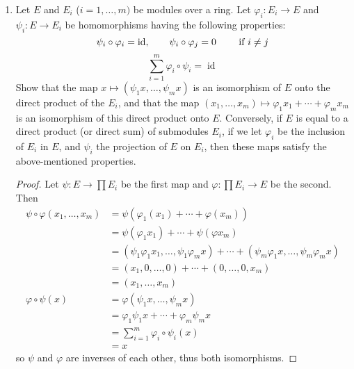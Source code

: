 \documentclass[10pt]{article}
\DeclareMathOperator*{\im}{Im}
\let\ker\relax
\DeclareMathOperator*{\ker}{Ker}
\DeclareMathOperator*{\id}{id}
\begin{document}
\begin{enumerate}
\begin{enumerate}
\begin{proof}
Since $f$ is the inclusion of $M'$, we know that $M = \im f \oplus N$ for some submodule $N$.  But $\im f \cong \ker g$, therefore $$M'' \cong M / \ker g = M / \im f \cong N$$
where the last equivalence follows from the fact that $0 \rightarrow A \rightarrow A \oplus B \rightarrow B \rightarrow 0$ is exact for any modules $A$ and $B$, so $(A \oplus B)/ A \cong B$ (we are taking $A = \im f$ and $B = N$).

\end{proof}

\item Let $E$ and $E_i$ ($i = 1,\dots , m)$ be modules over a ring.  Let $\varphi_i : E_i \rightarrow E$ and $\psi_i:E \rightarrow E_i$ be homomorphisms having the following properties:
$$
\psi_i \circ \varphi_i = \id, \hspace{.7cm} \psi_i \circ \varphi_j = 0 \hspace{.7cm} \text{ if } i \neq j$$
$$
\sum_{i=1}^m \varphi_i \circ \psi_i = \id
$$
Show that the map $x \mapsto (\psi_1 x, \dots , \psi_m x)$ is an isomorphism of $E$ onto the direct product of the $E_i$, and that the map $(x_1, \dots , x_m) \mapsto \varphi_1 x_1 + \cdots + \varphi_m x_m$ is an isomorphism of this direct product onto $E$.  Conversely, if $E$ is equal to a direct product (or direct sum) of submodules $E_i$, if we let $\varphi_i$ be the inclusion of $E_i$ in $E$, and $\psi_i$ the projection of $E$ on $E_i$, then these maps satisfy the above-mentioned properties.

\begin{proof}
Let $\psi: E \rightarrow \prod E_i$ be the first map and $\varphi : \prod E_i \rightarrow E$ be the second.  Then
\begin{align*}
\psi \circ \varphi (x_1, \dots, x_m) &= \psi ( \varphi_1 (x_1) + \cdots + \varphi(x_m)) \\
&= \psi (\varphi_1 x_1) + \cdots + \psi( \varphi x_m) \\
&= (\psi_1 \varphi_1 x_1, \dots, \psi_1 \varphi_m x) + \cdots + (\psi_m \varphi_1 x, \dots , \psi_m \varphi_m x) \\
&= (x_1 , 0 , \dots , 0) + \cdots + (0 , \dots , 0 , x_m)\\
&= (x_1, \dots , x_m) \\
\varphi \circ \psi (x) &= \varphi (\psi_1 x, \dots , \psi_m x) \\
&= \varphi_1 \psi_1 x + \cdots + \varphi_m \psi_m x \\
&= \sum_{i=1}^m \varphi_i \circ \psi_i ( x) \\
&= x
\end{align*}
so $\psi$ and $\varphi$ are inverses of each other, thus both isomorphisms.


\end{proof}
\end{enumerate}
\end{enumerate}
\end{document}
